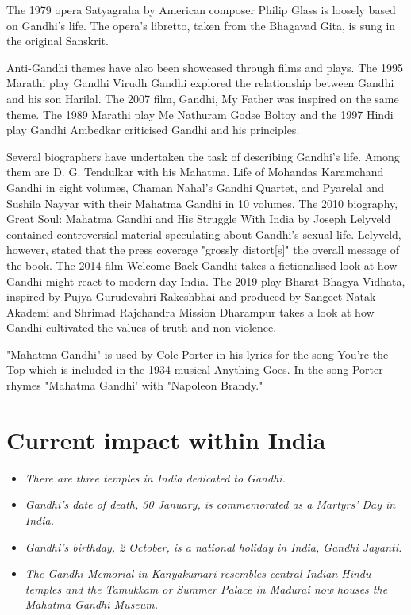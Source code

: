 The 1979 opera Satyagraha by American composer Philip Glass is loosely
based on Gandhi's life. The opera's libretto, taken from the Bhagavad
Gita, is sung in the original Sanskrit.

Anti-Gandhi themes have also been showcased through films and plays. The
1995 Marathi play Gandhi Virudh Gandhi explored the relationship between
Gandhi and his son Harilal. The 2007 film, Gandhi, My Father was
inspired on the same theme. The 1989 Marathi play Me Nathuram Godse
Boltoy and the 1997 Hindi play Gandhi Ambedkar criticised Gandhi and his
principles.

Several biographers have undertaken the task of describing Gandhi's
life. Among them are D. G. Tendulkar with his Mahatma. Life of Mohandas
Karamchand Gandhi in eight volumes, Chaman Nahal's Gandhi Quartet, and
Pyarelal and Sushila Nayyar with their Mahatma Gandhi in 10 volumes. The
2010 biography, Great Soul: Mahatma Gandhi and His Struggle With India
by Joseph Lelyveld contained controversial material speculating about
Gandhi's sexual life. Lelyveld, however, stated that the press coverage
"grossly distort{[}s{]}" the overall message of the book. The 2014 film
Welcome Back Gandhi takes a fictionalised look at how Gandhi might react
to modern day India. The 2019 play Bharat Bhagya Vidhata, inspired by
Pujya Gurudevshri Rakeshbhai and produced by Sangeet Natak Akademi and
Shrimad Rajchandra Mission Dharampur takes a look at how Gandhi
cultivated the values of truth and non-violence.

"Mahatma Gandhi" is used by Cole Porter in his lyrics for the song
You're the Top which is included in the 1934 musical Anything Goes. In
the song Porter rhymes "Mahatma Gandhi' with "Napoleon Brandy."

\section{Current impact within India}\label{current-impact-within-india}

\begin{itemize}
\item
  \emph{There are three temples in India dedicated to Gandhi.}
\item
  \emph{Gandhi's date of death, 30 January, is commemorated as a
  Martyrs' Day in India.}
\item
  \emph{Gandhi's birthday, 2 October, is a national holiday in India,
  Gandhi Jayanti.}
\item
  \emph{The Gandhi Memorial in Kanyakumari resembles central Indian
  Hindu temples and the Tamukkam or Summer Palace in Madurai now houses
  the Mahatma Gandhi Museum.}
\end{itemize}

